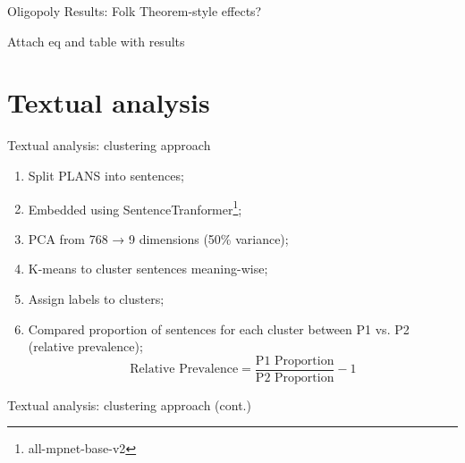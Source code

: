 \documentclass[10pt, aspectratio=169]{beamer}
\begin{document}
\begin{frame}{Oligopoly Results: Folk Theorem-style effects?}

Attach eq and table with results
    
\end{frame}

\section{Textual analysis}


\begin{frame}[fragile]{Textual analysis: clustering approach}
    \begin{enumerate}
        \item Split PLANS into sentences;
        \item Embedded using SentenceTranformer\footnote{all-mpnet-base-v2};
        \item PCA from 768 → 9 dimensions (50\% variance);
        \item K-means to cluster sentences meaning-wise;
        \item Assign labels to clusters;
        \item Compared proportion of sentences for each cluster between P1 vs. P2 (relative prevalence);
        $$
        \text{Relative Prevalence} = \frac{\text{P1 Proportion}}{\text{P2 Proportion}} - 1
        $$
    \end{enumerate}
\end{frame}


\begin{frame}[fragile]{Textual analysis: clustering approach (cont.)}



\end{frame}
\end{document}
